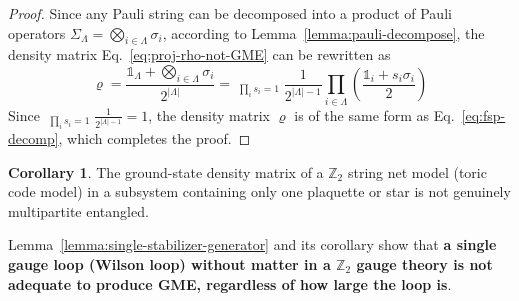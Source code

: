 \documentclass[12font]{article}
\numberwithin{equation}{section}    %
\theoremstyle{definition}
\newtheorem{corollary}{Corollary}[theorem]
\newcommand{\lr}[1]{\left(  #1  \right)}
\newcommand{\lrg}[1]{\left\{  #1  \right\}}
\newcommand{\abs}[1]{\left|  #1  \right|}
\begin{document}
\begin{proof}
Since any Pauli string can be decomposed into a product of Pauli operators $\Sigma_{\Lambda} = \bigotimes_{i\in\Lambda}\sigma_i$, according to Lemma~\ref{lemma:pauli-decompose}, the density matrix Eq.~\eqref{eq:proj-rho-not-GME} can be rewritten as
\[
\varrho = 
\frac{\mathds{1}_\Lambda + \bigotimes_{i\in\Lambda}\sigma_i }{2^{\abs{\Lambda}}}
= 
\mathop{\sum_{\lrg{s=\pm}}}_{\prod_is_i = 1}
\frac{1}{2^{\abs{\Lambda} - 1}} 
\prod_{i\in\Lambda}
\lr{\frac{\mathds{1}_i + s_i\sigma_i}{2}}
\]
Since $\mathop{\sum_{\lrg{s=\pm}}}_{\prod_is_i = 1}
\frac{1}{2^{\abs{\Lambda} - 1}} = 1$, the density matrix $\varrho$ is of the same form as Eq.~\eqref{eq:fsp-decomp}, which completes the proof.  
\end{proof}

\begin{corollary}\label{cor:single-generator}
    The ground-state density matrix of a $\mathbb{Z}_2$ string net model (toric code model) in a subsystem containing only one plaquette or star is not genuinely multipartite entangled.
\end{corollary}
Lemma~\ref{lemma:single-stabilizer-generator} and its corollary show that \textbf{a single gauge loop (Wilson loop) without matter in a $\mathbb{Z}_2$ gauge theory is not adequate to produce GME, regardless of how large the loop is}. 
\end{document}
